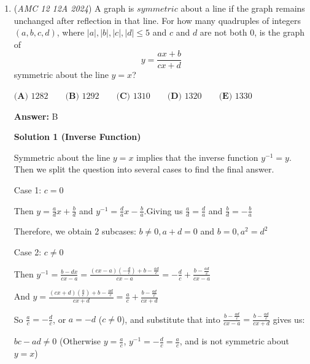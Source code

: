 \begin{enumerate}
 \textbf{2024 AMC 12A Q24:}

 All that is left is to find the surface area. The semi perimeter $s = \frac{15}{2}$, so the area through Heron's is $\frac{15\sqrt7}{4}$ and times the four sides the total area is $\boxed{15\sqrt{7}}$.

 \href{https://mathproblemsolvingskills.wordpress.com/}{MathProblemSolvingSkills.com}

 


	\item (\textit{AMC 12 12A 2024}) A graph is $\textit{symmetric}$ about a line if the graph remains unchanged after reflection in that line. For how many quadruples of integers $(a,b,c,d)$, where $|a|,|b|,|c|,|d|\le5$ and $c$ and $d$ are not both $0$, is the graph of 
 \[y=\frac{ax+b}{cx+d}\]symmetric about the line $y=x$?


 $\textbf{(A) }1282\qquad\textbf{(B) }1292\qquad\textbf{(C) }1310\qquad\textbf{(D) }1320\qquad\textbf{(E) }1330$

 \textbf{Answer: }B



\textbf{Solution 1 (Inverse Function)}

Symmetric about the line $y=x$ implies that the inverse function $y^{-1}=y$. Then we split the question into several cases to find the final answer.

 


 Case 1: $c=0$

 Then $y=\frac{a}{d}x+\frac{b}{d}$ and $y^{-1}=\frac{d}{a}x-\frac{b}{a}$.Giving us $\frac{a}{d}=\frac{d}{a}$ and $\frac{b}{d}=-\frac{b}{a}$

 Therefore, we obtain 2 subcases: $b\neq 0, a+d=0$ and $b=0, a^2=d^2$

 


 Case 2: $c\neq 0$

 Then $y^{-1}=\frac{b-dx}{cx-a}=\frac{(cx-a)(-\frac{d}{c})+b-\frac{ad}{c}}{cx-a}=-\frac{d}{c}+\frac{b-\frac{ad}{c}}{cx-a}$

 And $y=\frac{(cx+d)(\frac{a}{c})+b-\frac{ad}{c}}{cx+d}=\frac{a}{c}+\frac{b-\frac{ad}{c}}{cx+d}$

 So $\frac{a}{c}=-\frac{d}{c}$, or $a=-d$ ($c\neq 0$), and substitute that into $\frac{b-\frac{ad}{c}}{cx-a}=\frac{b-\frac{ad}{c}}{cx+d}$ gives us:

 $bc-ad\neq 0$ (Otherwise $y=\frac{a}{c}$, $y^{-1}=-\frac{d}{c}=\frac{a}{c}$, and is not symmetric about $y=x$)

 



\end{enumerate}
